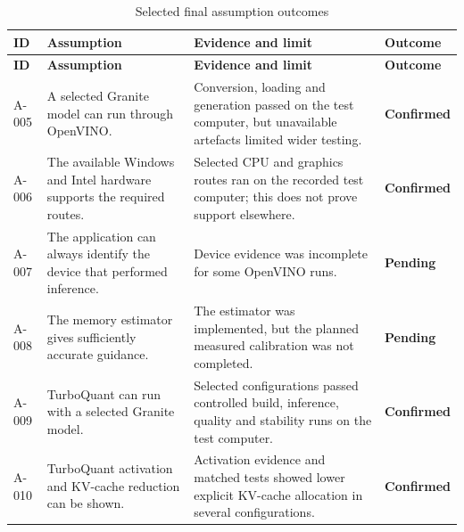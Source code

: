 \begingroup
\small
\setlength{\LTpre}{4pt}
\setlength{\LTpost}{4pt}
\renewcommand{\arraystretch}{0.96}
\begin{longtable}{@{}P{0.09\dimexpr{}\tabcolsep\relax}P{0.30\dimexpr{}\tabcolsep\relax}P{0.47\dimexpr{}\tabcolsep\relax}P{0.14\dimexpr{}\tabcolsep\relax}@{}}
    \caption{Selected final assumption outcomes}
    \label{tab:assumption-log} \\
    \toprule
    \textbf{ID} & \textbf{Assumption} & \textbf{Evidence and limit} &
    \textbf{Outcome} \\
    \midrule
    \endfirsthead

    \toprule
    \textbf{ID} & \textbf{Assumption} & \textbf{Evidence and limit} &
    \textbf{Outcome} \\
    \midrule
    \endhead

    A-005 & A selected Granite model can run through OpenVINO. &
    Conversion, loading and generation passed on the test computer, but unavailable
    artefacts limited wider testing. &
    \textbf{Confirmed} \\

    A-006 & The available Windows and Intel hardware supports the required routes. &
    Selected CPU and graphics routes ran on the recorded test computer; this does
    not prove support elsewhere. &
    \textbf{Confirmed} \\

    A-007 & The application can always identify the device that performed inference. &
    Device evidence was incomplete for some OpenVINO runs. &
    \textbf{Pending} \\

    A-008 & The memory estimator gives sufficiently accurate guidance. &
    The estimator was implemented, but the planned measured calibration was not completed. &
    \textbf{Pending} \\

    A-009 & TurboQuant can run with a selected Granite model. &
    Selected configurations passed controlled build, inference, quality and stability runs
    on the test computer. &
    \textbf{Confirmed} \\

    A-010 & TurboQuant activation and KV-cache reduction can be shown. &
    Activation evidence and matched tests showed lower explicit KV-cache allocation
    in several configurations. &
    \textbf{Confirmed} \\


\end{longtable}
